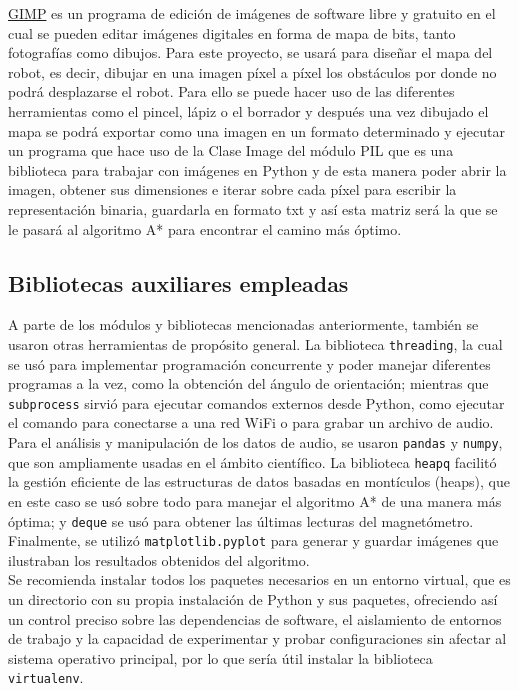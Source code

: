 \hyperlink{GIMP}{GIMP} es un programa de edición de imágenes de software libre y gratuito en el cual se pueden editar imágenes digitales en forma de mapa de bits, tanto fotografías como dibujos. Para este proyecto, se usará para diseñar el mapa del robot, es decir, dibujar en una imagen píxel a píxel los obstáculos por donde no podrá desplazarse el robot. Para ello se puede hacer uso de las diferentes herramientas como el pincel, lápiz o el borrador y después una vez dibujado el mapa se podrá exportar como una imagen en un formato determinado y ejecutar un programa que hace uso de la Clase Image del módulo PIL que es una biblioteca para trabajar con imágenes en Python y de esta manera poder abrir la imagen, obtener sus dimensiones e iterar sobre cada píxel para escribir la representación binaria, guardarla en formato txt y así esta matriz será la que se le pasará al algoritmo A* para encontrar el camino más óptimo.


\subsection{Bibliotecas auxiliares empleadas}
\label{subsec:bibliotecas}

A parte de los módulos y bibliotecas mencionadas anteriormente, también se usaron otras herramientas de propósito general. La biblioteca \texttt{threading}, la cual se usó para implementar programación concurrente y poder manejar diferentes programas a la vez, como la obtención del ángulo de orientación; mientras que \texttt{subprocess} sirvió para ejecutar comandos externos desde Python, como ejecutar el comando para conectarse a una red WiFi o para grabar un archivo de audio. Para el análisis y manipulación de los datos de audio, se usaron \texttt{pandas} y \texttt{numpy}, que son ampliamente usadas en el ámbito científico. La biblioteca \texttt{heapq} facilitó la gestión eficiente de las estructuras de datos basadas en montículos (heaps), que en este caso se usó sobre todo para manejar el algoritmo A* de una manera más óptima; y \texttt{deque} se usó para obtener las últimas lecturas del magnetómetro. Finalmente, se utilizó \texttt{matplotlib.pyplot} para generar y guardar imágenes que ilustraban los resultados obtenidos del algoritmo.\\

Se recomienda instalar todos los paquetes necesarios en un entorno virtual, que es un directorio con su propia instalación de Python y sus paquetes, ofreciendo así un control preciso sobre las dependencias de software, el aislamiento de entornos de trabajo y la capacidad de experimentar y probar configuraciones sin afectar al sistema operativo principal, por lo que sería útil instalar la biblioteca \texttt{virtualenv}.


